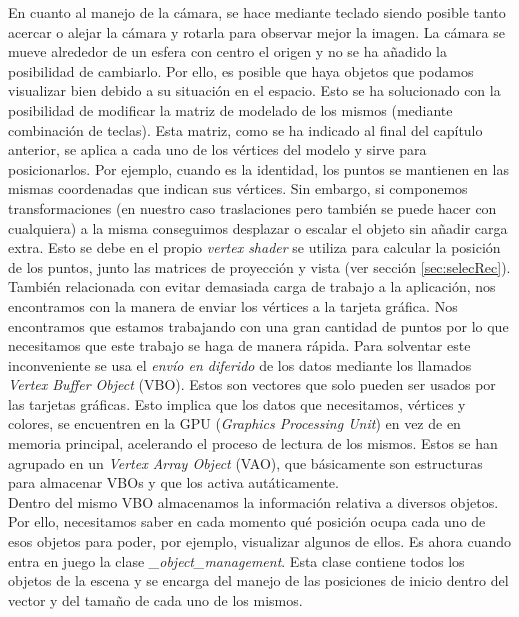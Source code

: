 En cuanto al manejo de la cámara, se hace mediante teclado siendo posible tanto acercar o alejar la cámara y rotarla para observar mejor la imagen. La cámara se mueve alrededor de un esfera con centro el origen y no se ha añadido la posibilidad de cambiarlo. Por ello, es posible que haya objetos que podamos visualizar bien debido a su situación en el espacio. Esto se ha solucionado con la posibilidad de modificar la matriz de modelado de los mismos (mediante combinación de teclas). Esta matriz, como se ha indicado al final del capítulo anterior, se aplica a cada uno de los vértices del modelo y sirve para posicionarlos. Por ejemplo, cuando es la identidad, los puntos se mantienen en las mismas coordenadas que indican sus vértices. Sin embargo, si componemos transformaciones (en nuestro caso traslaciones pero también se puede hacer con cualquiera) a la misma conseguimos desplazar o escalar el objeto sin añadir carga extra. Esto se debe en el propio \textit{vertex shader} se utiliza para calcular la posición de los puntos, junto las matrices de proyección y vista (ver sección \ref{sec:selecRec}). \\

También relacionada con evitar demasiada carga de trabajo a la aplicación, nos encontramos con la manera de enviar los vértices a la tarjeta gráfica. Nos encontramos que estamos trabajando con una gran cantidad de puntos por lo que necesitamos que este trabajo se haga de manera rápida. Para solventar este inconveniente se usa el \textit{envío en diferido} de los datos mediante los llamados \textit{Vertex Buffer Object} (VBO). Estos son vectores que solo pueden ser usados por las tarjetas gráficas. Esto implica que los datos que necesitamos, vértices y colores, se encuentren en la GPU (\textit{Graphics Processing Unit}) en vez de en memoria principal, acelerando el proceso de lectura de los mismos. Estos se han agrupado en un \textit{Vertex Array Object} (VAO), que básicamente son estructuras para almacenar VBOs y que los activa autáticamente. \\

Dentro del mismo VBO almacenamos la información relativa a diversos objetos. Por ello, necesitamos saber en cada momento qué posición ocupa cada uno de esos objetos para poder, por ejemplo, visualizar algunos de ellos. Es ahora cuando entra en juego la clase \textit{\_object\_management}. Esta clase contiene todos los objetos de la escena y se encarga del manejo de las posiciones de inicio dentro del vector y del tamaño de cada uno de los mismos. \\

